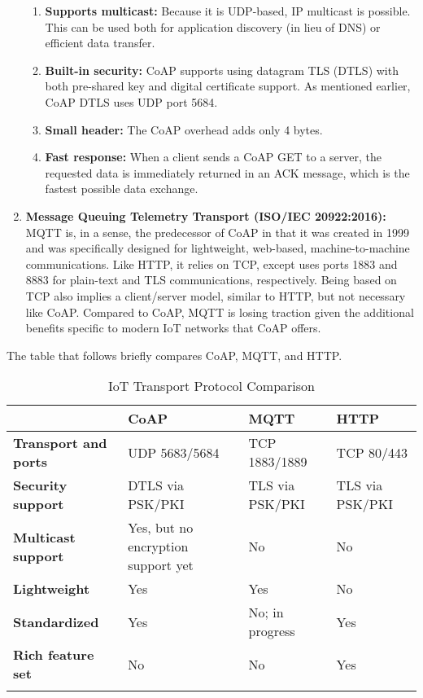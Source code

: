 \begin{enumerate}
  \begin{enumerate}
    \item \textbf{Supports multicast:} Because it is UDP-based, IP multicast
	is possible. This can be used both for application discovery (in lieu of DNS)
	or efficient data transfer.
    \item \textbf{Built-in security:} CoAP supports using datagram TLS (DTLS)
	with both pre-shared key and digital certificate support. As mentioned
	earlier, CoAP DTLS uses UDP port 5684.
    \item \textbf{Small header:} The CoAP overhead adds only 4 bytes.
    \item \textbf{Fast response:} When a client sends a CoAP GET to a server,
	the requested data is immediately returned in an ACK message, which is the
	fastest possible data exchange.
  \end{enumerate}

  \item \textbf{Message Queuing Telemetry Transport (ISO/IEC 20922:2016):}
  MQTT is, in a sense, the predecessor of CoAP in that it was created in 1999
  and was specifically designed for lightweight, web-based, machine-to-machine
  communications. Like HTTP, it relies on TCP, except uses ports 1883 and 8883
  for plain-text and TLS communications, respectively. Being based on TCP also
  implies a client/server model, similar to HTTP, but not necessary like CoAP\@.
  Compared to CoAP, MQTT is losing traction given the additional benefits
  specific to modern IoT networks that CoAP offers.
\end{enumerate}

The table that follows briefly compares CoAP, MQTT, and HTTP\@.

\begin{longtable}{llll}
\toprule
&
\textbf{CoAP}
&
\textbf{MQTT}
&
\textbf{HTTP}
\\ \midrule
\textbf{Transport and ports}
&
UDP 5683/5684
&
TCP 1883/1889
&
TCP 80/443
\\ \midrule
\textbf{Security support}
&
DTLS via PSK/PKI
&
TLS via PSK/PKI
&
TLS via PSK/PKI
\\ \midrule
\textbf{Multicast support}
&
Yes, but no encryption support yet
&
No
&
No
\\ \midrule
\textbf{Lightweight}
&
Yes
&
Yes
&
No
\\ \midrule
\textbf{Standardized}
&
Yes
&
No; in progress
&
Yes
\\ \midrule
\textbf{Rich feature set}
&
No
&
No
&
Yes
\\
\bottomrule
\caption{IoT Transport Protocol Comparison}
\end{longtable}

